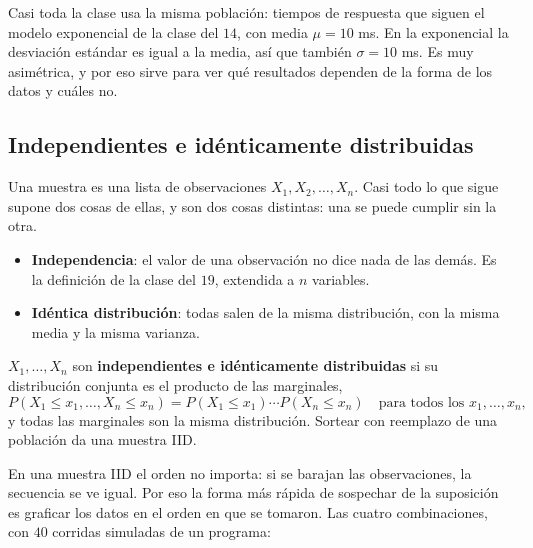 \documentclass[11pt,letterpaper]{article}
\begin{document}
Casi toda la clase usa la misma población: tiempos de respuesta que siguen
el modelo exponencial de la clase del $14$, con media $\mu = 10$ ms.
En la exponencial la desviación estándar es igual a la media, así que
también $\sigma = 10$ ms. Es muy asimétrica, y por eso sirve para ver
qué resultados dependen de la forma de los datos y cuáles no.


\subsection*{Independientes e idénticamente distribuidas}

Una muestra es una lista de observaciones $X_1, X_2, \ldots, X_n$.
Casi todo lo que sigue supone dos cosas de ellas, y son dos cosas
distintas: una se puede cumplir sin la otra.

\begin{itemize}[itemsep=0.3em]
    \item \textbf{Independencia}: el valor de una observación no dice
          nada de las demás. Es la definición de la clase del $19$,
          extendida a $n$ variables.
    \item \textbf{Idéntica distribución}: todas salen de la misma
          distribución, con la misma media y la misma varianza.
\end{itemize}

\begin{definicion}
    $X_1, \ldots, X_n$ son \textbf{independientes e idénticamente
    distribuidas} si su distribución conjunta es el producto de las
    marginales,
    \[
        P(X_1 \le x_1, \ldots, X_n \le x_n)
        = P(X_1 \le x_1) \cdots P(X_n \le x_n)
        \quad \text{para todos los } x_1, \ldots, x_n ,
    \]
    y todas las marginales son la misma distribución. Sortear con
    reemplazo de una población da una muestra IID.
\end{definicion}

En una muestra IID el orden no importa: si se barajan las
observaciones, la secuencia se ve igual. Por eso la forma más rápida
de sospechar de la suposición es graficar los datos en el orden en que
se tomaron. Las cuatro combinaciones, con $40$ corridas simuladas de un
programa:
\end{document}
